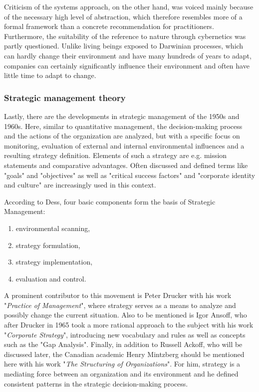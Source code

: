 \documentclass[a4paper,12pt]{scrartcl}
\begin{document}
Criticism of the systems approach, on the other hand, was voiced mainly because of the necessary high level of abstraction, which therefore resembles more of a formal framework than a concrete recommendation for practitioners.
Furthermore, the suitability of the reference to nature through cybernetics was partly questioned. Unlike living beings exposed to Darwinian processes, which can hardly change their environment and have many hundreds of years to adapt, companies can certainly significantly influence their environment and often have little time to adapt to change.\cite{oelsnitz:2009}

\subsubsection{Strategic management theory}
Lastly, there are the developments in strategic management of the 1950s and 1960s. Here, similar to quantitative management, the decision-making process and the actions of the organization are analyzed, but with a specific focus on monitoring, evaluation of external and internal environmental influences and a resulting strategy definition. Elements of such a strategy are e.g. mission statements and comparative advantages. Often discussed and defined terms like "goals" and "objectives" as well as "critical success factors" and "corporate identity and culture" are increasingly used in this context.\cite{pindur:1995}

According to Dess, four basic components form the basis of Strategic Management:\cite{dess:1993}
\begin{enumerate}
\item environmental scanning,
\item strategy formulation,
\item strategy implementation,
\item evaluation and control.
\end{enumerate}

A prominent contributor to this movement is Peter Drucker with his work "\textit{Practice of Management}", where strategy serves as a means to analyze and possibly change the current situation. Also to be mentioned is Igor Ansoff, who after Drucker in 1965 took a more rational approach to the subject with his work "\textit{Corporate Strategy}", introducing new vocabulary and rules as well as concepts such as the "Gap Analysis".\cite{ansoff:1965}
Finally, in addition to Russell Ackoff, who will be discussed later, the Canadian academic Henry Mintzberg should be mentioned here with his work "\textit{The Structuring of Organizations}". For him, strategy is a mediating force between an organization and its environment and he defined consistent patterns in the strategic decision-making process.\cite{pindur:1995}
\end{document}
